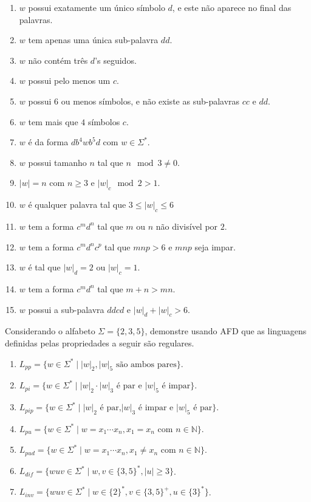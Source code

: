 \begin{enumerate}
	\item $w$ possui exatamente um único símbolo $d$, e este não aparece no final das palavras.
	\item $w$ tem apenas uma única sub-palavra $dd$.
	\item $w$ não contém três $d$'s seguidos.
	\item $w$ possui pelo menos um $c$.
	\item $w$ possui 6 ou menos símbolos, e não existe as sub-palavras $cc$ e $dd$.
	\item $w$ tem mais que $4$ símbolos $c$.
	\item $w$ é da forma $db^4wb^5d$ com $w \in \Sigma^*$.
	\item $w$ possui tamanho $n$ tal que $n \mod 3 \neq 0$.
	\item $|w| = n$ com $n \geq 3$ e $|w|_c \mod 2 > 1$.
	\item $w$ é qualquer palavra tal que $3 \leq |w|_c \leq 6$
	\item $w$ tem a forma $c^md^n$ tal que $m$ ou $n$ não divisível por $2$.
	\item $w$ tem a forma $c^md^nc^p$ tal que $mnp > 6$ e $mnp$ seja impar.
	\item $w$ é tal que $|w|_d = 2$ ou $|w|_c = 1$.
	\item $w$ tem a forma $c^md^n$ tal que $m+n > mn$.
	\item $w$ possui a sub-palavra  $ddcd$ e $|w|_d + |w|_c > 6$.
\end{enumerate}

\begin{exercise}\label{exerc:LR11}
	Considerando o alfabeto $\Sigma = \{2, 3, 5\}$, demonstre usando AFD que as linguagens definidas pelas propriedades a seguir são regulares.
\end{exercise}

\begin{enumerate}
	\item $L_{pp} = \{w \in \Sigma^* \mid |w|_2, |w|_5 \text{ são ambos pares}\}$.
	\item $L_{pi} = \{w \in \Sigma^* \mid |w|_2 \cdot |w|_3 \text{ é par e } |w|_5 \text{ é impar}\}$.
	\item $L_{pip} = \{w \in \Sigma^* \mid |w|_2 \text{ é par,} |w|_3 \text{ é impar e } |w|_5 \text{ é par}\}$.
	\item $L_{pu} = \{w \in \Sigma^* \mid w = x_1\cdots x_n, x_1 = x_n \text{ com } n \in \mathbb{N}\}$.
	\item $L_{pud} = \{w \in \Sigma^* \mid w = x_1\cdots x_n, x_1 \neq x_n \text{ com } n \in \mathbb{N}\}$.
	\item $L_{dif} = \{wuv \in \Sigma^* \mid w,v \in \{3,5\}^*, |u| \geq 3\}$.
	\item $L_{inv} = \{wuv \in \Sigma^* \mid w \in \{2\}^*,v \in \{3,5\}^+, u \in \{3\}^*\}$.
\end{enumerate}

